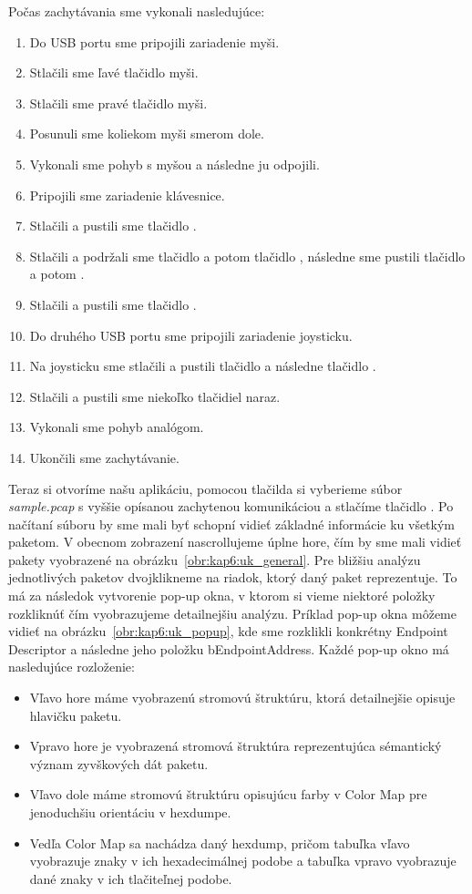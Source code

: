 Počas zachytávania sme vykonali nasledujúce:
\begin{enumerate}
\item Do USB portu sme pripojili zariadenie myši.
\item \label{kap06:uz_dok:krok1} Stlačili sme ľavé tlačidlo myši.
\item Stlačili sme pravé tlačidlo myši.
\item Posunuli sme koliekom myši smerom dole.
\item Vykonali sme pohyb s myšou a následne ju odpojili.
\item Pripojili sme zariadenie klávesnice.
\item Stlačili a pustili sme tlačidlo .
\item \label{kap06:uz_dok:krok7} Stlačili a podržali sme tlačidlo  a potom tlačidlo , následne sme pustili tlačidlo  a potom .
\item Stlačili a pustili sme tlačidlo .
\item Do druhého USB portu sme pripojili zariadenie joysticku.
\item Na joysticku sme stlačili a pustili tlačidlo  a následne tlačidlo .
\item Stlačili a pustili sme niekoľko tlačidiel naraz.
\item \label{kap06:uz_dok:krok12} Vykonali sme pohyb analógom.
\item Ukončili sme zachytávanie.
\end{enumerate}

Teraz si otvoríme našu aplikáciu, pomocou tlačilda  si vyberieme súbor \textit{sample.pcap} s vyššie opísanou zachytenou komunikáciou a stlačíme tlačidlo . Po načítaní súboru by sme mali byť schopní vidieť základné informácie ku všetkým paketom. V obecnom zobrazení nascrollujeme úplne hore, čím by sme mali vidieť pakety vyobrazené na obrázku~\ref{obr:kap6:uk_general}. Pre bližšiu analýzu jednotlivých paketov dvojklikneme na riadok, ktorý daný paket reprezentuje. To má za následok vytvorenie pop-up okna, v ktorom si vieme niektoré položky rozkliknúť čím vyobrazujeme detailnejšiu analýzu. Príklad pop-up okna môžeme vidieť na obrázku~\ref{obr:kap6:uk_popup}, kde sme rozklikli konkrétny Endpoint Descriptor a následne jeho položku bEndpointAddress. Každé pop-up okno má nasledujúce rozloženie:
\begin{itemize}
\item Vľavo hore máme vyobrazenú stromovú štruktúru, ktorá detailnejšie opisuje hlavičku paketu.
\item Vpravo hore je vyobrazená stromová štruktúra reprezentujúca sémantický význam zyvškových dát paketu.
\item Vľavo dole máme stromovú štruktúru opisujúcu farby v Color Map pre jenoduchšiu orientáciu v hexdumpe.
\item Vedľa Color Map sa nachádza daný hexdump, pričom tabuľka vľavo vyobrazuje znaky v ich hexadecimálnej podobe a tabuľka vpravo vyobrazuje dané znaky v ich tlačiteľnej podobe.
\end{itemize}

